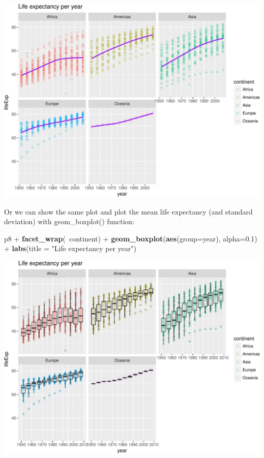\documentclass[]{article}
\newenvironment{Shaded}{\begin{snugshade}}{\end{snugshade}}
\newcommand{\KeywordTok}[1]{\textcolor[rgb]{0.13,0.29,0.53}{\textbf{{#1}}}}
\newcommand{\DataTypeTok}[1]{\textcolor[rgb]{0.13,0.29,0.53}{{#1}}}
\newcommand{\FloatTok}[1]{\textcolor[rgb]{0.00,0.00,0.81}{{#1}}}
\newcommand{\StringTok}[1]{\textcolor[rgb]{0.31,0.60,0.02}{{#1}}}
\newcommand{\NormalTok}[1]{{#1}}
\begin{document}
\includegraphics{gapminder-exploration-phase2_files/figure-latex/unnamed-chunk-22-1.pdf}

Or we can show the same plot and plot the mean life expectancy (and
standard deviation) with geom\_boxplot() function:

\begin{Shaded}
\begin{Highlighting}[]
\NormalTok{p8 +}\StringTok{ }\KeywordTok{facet_wrap}\NormalTok{(~continent) +}\StringTok{ }\KeywordTok{geom_boxplot}\NormalTok{(}\KeywordTok{aes}\NormalTok{(}\DataTypeTok{group=}\NormalTok{year), }\DataTypeTok{alpha=}\FloatTok{0.1}\NormalTok{) +}
\StringTok{  }\KeywordTok{labs}\NormalTok{(}\DataTypeTok{title =} \StringTok{"Life expectancy per year"}\NormalTok{) }
\end{Highlighting}
\end{Shaded}

\includegraphics{gapminder-exploration-phase2_files/figure-latex/unnamed-chunk-23-1.pdf}
\end{document}
